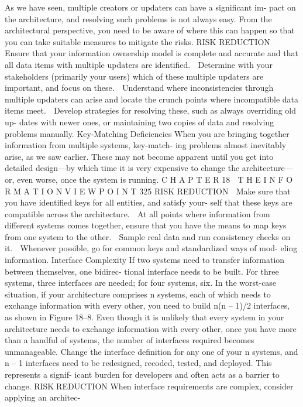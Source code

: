 As we have seen, multiple creators or updaters can have a significant im-
pact on the architecture, and resolving such problems is not always easy.
From the architectural perspective, you need to be aware of where this can
happen so that you can take suitable measures to mitigate the risks.
RISK REDUCTION
 Ensure that your information ownership model is complete and accurate
and that all data items with multiple updaters are identified.
 Determine with your stakeholders (primarily your users) which of these
multiple updaters are important, and focus on these.
 Understand where inconsistencies through multiple updaters can arise
and locate the crunch points where incompatible data items meet.
 Develop strategies for resolving these, such as always overriding old up-
dates with newer ones, or maintaining two copies of data and resolving
problems manually.
Key-Matching Deficiencies
When you are bringing together information from multiple systems, key-match-
ing problems almost inevitably arise, as we saw earlier. These may not become
apparent until you get into detailed design—by which time it is very expensive to
change the architecture—or, even worse, once the system is running.
C H A P T E R 18  T H E I N F O R M A T I O N V I E W P O I N T
 325
RISK REDUCTION
 Make sure that you have identified keys for all entities, and satisfy your-
self that these keys are compatible across the architecture.
 At all points where information from different systems comes together,
ensure that you have the means to map keys from one system to the
other.
 Sample real data and run consistency checks on it.
 Whenever possible, go for common keys and standardized ways of mod-
eling information.
Interface Complexity
If two systems need to transfer information between themselves, one bidirec-
tional interface needs to be built. For three systems, three interfaces are
needed; for four systems, six. In the worst-case situation, if your architecture
comprises n systems, each of which needs to exchange information with
every other, you need to build n(n – 1)/2 interfaces, as shown in Figure 18–8.
Even though it is unlikely that every system in your architecture needs to
exchange information with every other, once you have more than a handful of
systems, the number of interfaces required becomes unmanageable. Change
the interface definition for any one of your n systems, and n – 1 interfaces
need to be redesigned, recoded, tested, and deployed. This represents a signif-
icant burden for developers and often acts as a barrier to change.
RISKREDUCTION
When interface requirements are complex, consider applying an architec-
